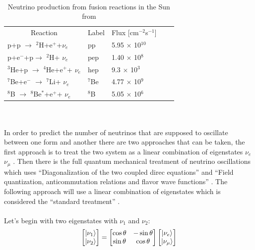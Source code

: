\documentclass[12pt,a4paper]{article}
\begin{document}
\\
\begin{table}
\centering
\begin{tabular}{lllll}  
\toprule
\multicolumn{1}{c}{Reaction} & \multicolumn{1}{c}{Label} & \multicolumn{1}{c}{Flux [cm$^{-2}$s$^{-1}$]}
\\
\cmidrule(r){1-1}
\cmidrule(r){2-2}
\cmidrule(r){3-3}
p+p $\rightarrow$ $^2$H+e$^+$+$\nu_e$           & pp                & 5.95 $\times$ 10$^{10}$\\
p+e$^-$+p$\rightarrow$ $^2$H+ $\nu_e$           & pep               & 1.40 $\times$ 10$^{8}$\\
$^3$He+p $\rightarrow$ $^4$He+e$^+$+ $\nu_e$     & hep               & 9.3  $\times$ 10$^{3}$\\
$^7$Be+e$^-$ $\rightarrow$ $^7$Li+ $\nu_e$       & $^7$Be            & 4.77 $\times$ 10$^{9}$\\
$^8$B $\rightarrow$ $^8$Be$^*$+e$^+$+ $\nu_e$   & $^8$B             & 5.05 $\times$ 10$^{6}$\\
\bottomrule   
\end{tabular}
\caption{Neutrino production from fusion reactions in the Sun from \cite{Bellerive:2003rj} }
\label{solar_nuetrino_table}
\end{table}
\\\\In order to predict the number of neutrinos that are supposed to oscillate between one form and another there are two approaches that can be taken, the first approach is to treat the two system as a linear combination of eigenstates $\nu_e$ $\nu_\mu$ \cite{griffiths2008book}\cite{griffiths2008neutrinoOscillations} \cite{sassaroli1999neutrino}. Then there is the full quantum mechanical treatment of neutrino oscillations which uses ``Diagonalization of the two coupled direc equations'' and ``Field quantization, anticommutation relations and flavor wave functions'' \cite{sassaroli1999neutrino}. The following approach will use a linear combination of eigenstates which is considered the ``standard treatment'' \cite{sassaroli1999neutrino} \cite{griffiths2008book} \cite{griffiths2008neutrinoOscillations}.
\\\\Let's begin with two eigenstates with $\nu_1$ and $\nu_2$: 
\begin{equation}
    \begin{bmatrix}
        \ket{\nu_1} \\
        \ket{\nu_2}
    \end{bmatrix}
    =
    \begin{bmatrix}
        \cos\theta & -\sin\theta \\
        \sin\theta & \cos\theta 
    \end{bmatrix}
        \begin{bmatrix}
        \ket{\nu_e} \\
        \ket{\nu_\mu}
    \end{bmatrix}
    \label{linear_combination_eq_1}
\end{equation}
\end{document}
